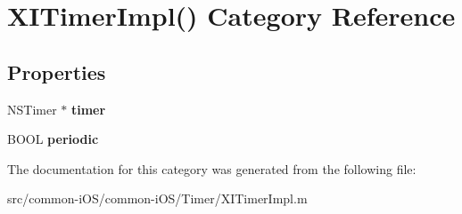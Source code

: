 \hypertarget{category_x_i_timer_impl_07_08}{}\section{X\+I\+Timer\+Impl() Category Reference}
\label{category_x_i_timer_impl_07_08}
\subsection*{Properties}
\begin{DoxyCompactItemize}
\item 
\hypertarget{category_x_i_timer_impl_07_08_a96bb595c5884efb17689d226be473c48}{}\label{category_x_i_timer_impl_07_08_a96bb595c5884efb17689d226be473c48} 
N\+S\+Timer $\ast$ {\bfseries timer}
\item 
\hypertarget{category_x_i_timer_impl_07_08_a4d13245be56e660d5223d50d4a0bf28b}{}\label{category_x_i_timer_impl_07_08_a4d13245be56e660d5223d50d4a0bf28b} 
B\+O\+OL {\bfseries periodic}
\end{DoxyCompactItemize}


The documentation for this category was generated from the following file\+:\begin{DoxyCompactItemize}
\item 
src/common-\/i\+O\+S/common-\/i\+O\+S/\+Timer/X\+I\+Timer\+Impl.\+m\end{DoxyCompactItemize}
